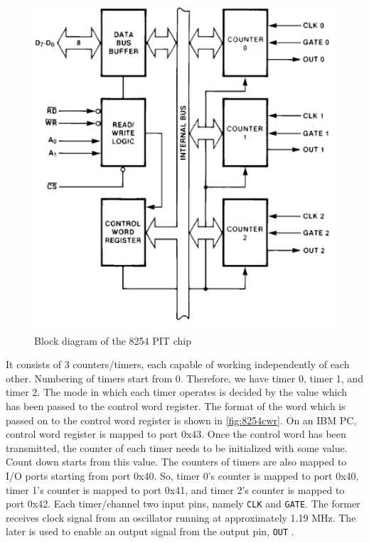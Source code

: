 \begin{figure}[h]
  \centering
  \includegraphics[scale=0.30]{figures/8254.eps}
  \caption{Block diagram of the 8254 PIT chip \cite{intel1993PIT}}
\label{fig:8254}
\end{figure}

It consists of 3 counters/timers, each capable of working independently of each other. Numbering of timers start from 0. Therefore, we have timer 0, timer 1, and timer 2. The mode in which each timer operates is decided by the value which has been passed to the control word register. The format of the word which is passed on to the control word register is shown in \autoref{fig:8254cwr}. On an IBM PC, control word register is mapped to port 0x43. Once the control word has been transmitted, the counter of each timer needs to be initialized with some value. Count down starts from this value. The counters of timers are also mapped to I/O ports starting from port 0x40. So, timer 0's counter is mapped to port 0x40, timer 1's counter is mapped to port 0x41, and timer 2's counter is mapped to port 0x42. Each timer/channel two input pins, namely \texttt{CLK} and \texttt{GATE}. The former receives clock signal from an oscillator running at approximately 1.19 MHz. The later is used to enable an output signal from the output pin, \texttt{OUT} \cite{intel1993PIT}.

